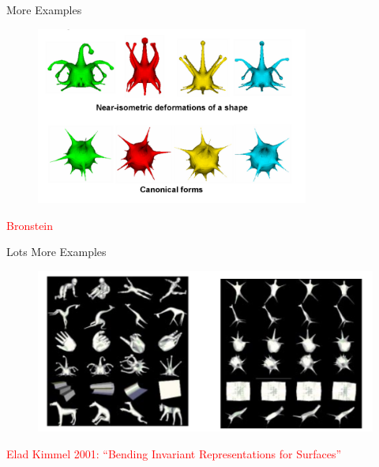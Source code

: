 \documentclass{beamer}
\begin{document}
\begin{frame}{More Examples}

\begin{figure}[t]
    \includegraphics[width=0.8\textwidth]{Bronstein_CanonicalForms.png}
\end{figure}

\textcolor{red}{Bronstein}

\end{frame}

\begin{frame}{Lots More Examples}

\begin{figure}[t]
    \includegraphics[width=\textwidth]{EladKimmel_CanonicalForms.png}
\end{figure}
\textcolor{red}{Elad Kimmel 2001: ``Bending Invariant Representations for Surfaces''}

\end{frame}
\end{document}
